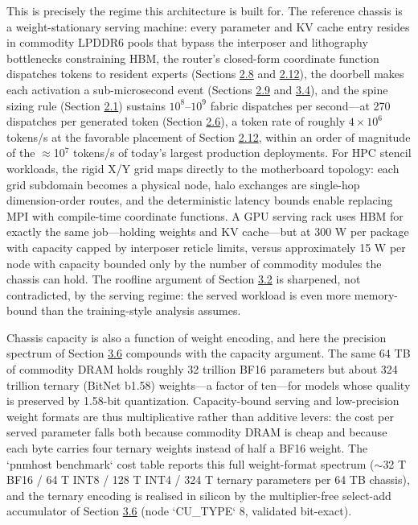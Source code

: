 \documentclass[10pt,twocolumn]{article}
\begin{document}
This is precisely the regime this architecture is built for. The reference chassis is a weight-stationary serving machine: every parameter and KV cache entry resides in commodity LPDDR6 pools that bypass the interposer and lithography bottlenecks constraining HBM, the router's closed-form coordinate function dispatches tokens to resident experts (Sections \hyperref[sec:2.8]{2.8} and \hyperref[sec:2.12]{2.12}), the doorbell makes each activation a sub-microsecond event (Sections \hyperref[sec:2.9]{2.9} and \hyperref[sec:3.4]{3.4}), and the spine sizing rule (Section \hyperref[sec:2.1]{2.1}) sustains $10^{8}$--$10^{9}$ fabric dispatches per second---at 270 dispatches per generated token (Section \hyperref[sec:2.6]{2.6}), a token rate of roughly $4\times10^{6}$ tokens/s at the favorable placement of Section \hyperref[sec:2.12]{2.12}, within an order of magnitude of the $\approx$10$^{7}$ tokens/s of today's largest production deployments\cite{24}. For HPC stencil workloads, the rigid X/Y grid maps directly to the motherboard topology: each grid subdomain becomes a physical node, halo exchanges are single-hop dimension-order routes, and the deterministic latency bounds enable replacing MPI with compile-time coordinate functions. A GPU serving rack uses HBM for exactly the same job---holding weights and KV cache---but at 300 W per package with capacity capped by interposer reticle limits, versus approximately 15 W per node with capacity bounded only by the number of commodity modules the chassis can hold. The roofline argument of Section \hyperref[sec:3.2]{3.2} is sharpened, not contradicted, by the serving regime: the served workload is even more memory-bound than the training-style analysis assumes.

Chassis capacity is also a function of weight encoding, and here the precision spectrum of Section \hyperref[sec:3.6]{3.6} compounds with the capacity argument. The same 64 TB of commodity DRAM holds roughly 32 trillion BF16 parameters but about 324 trillion ternary (BitNet b1.58) weights---a factor of ten---for models whose quality is preserved by 1.58-bit quantization\cite{42}. Capacity-bound serving and low-precision weight formats are thus multiplicative rather than additive levers: the cost per served parameter falls both because commodity DRAM is cheap and because each byte carries four ternary weights instead of half a BF16 weight. The `pnmhost benchmark` cost table reports this full weight-format spectrum ($\sim$32 T BF16 / 64 T INT8 / 128 T INT4 / 324 T ternary parameters per 64 TB chassis), and the ternary encoding is realised in silicon by the multiplier-free select-add accumulator of Section \hyperref[sec:3.6]{3.6} (node `CU\_TYPE` 8, validated bit-exact).
\end{document}
